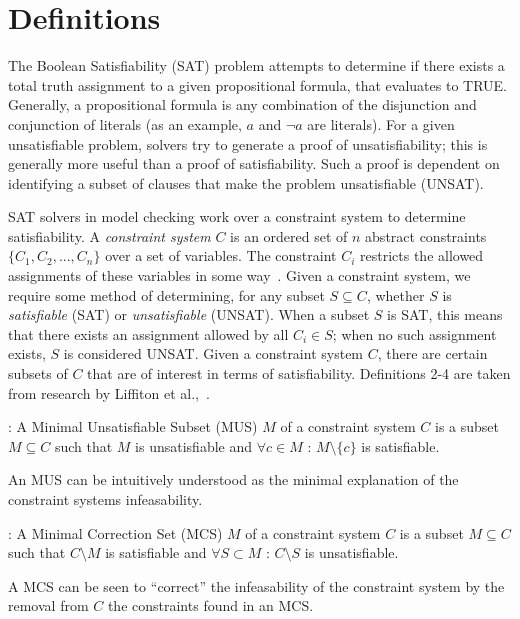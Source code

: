 \section{Definitions}
The Boolean Satisfiability (SAT) problem attempts to determine if there exists a total truth assignment to a given propositional formula, that evaluates to TRUE. Generally, a propositional formula is any combination of the disjunction and conjunction of literals (as an example, $a$ and $\neg a$ are literals). For a given unsatisfiable problem, solvers try to generate a proof of unsatisfiability; this is generally more useful than a proof of satisfiability. Such a proof is dependent on identifying a subset of clauses that make the problem unsatisfiable (UNSAT). 

SAT solvers in model checking work over a constraint system to determine satisfiability. A \textit{constraint system} $C$ is an ordered set of $n$ abstract constraints $\{C_1, C_2, ..., C_n\}$ over a set of variables. The constraint $C_i$ restricts the allowed assignments of these variables in some way~\cite{liffiton2016fast}. Given a constraint system, we require some method of determining, for any subset $S \subseteq C$, whether $S$ is \textit{satisfiable} (SAT) or \textit{unsatisfiable} (UNSAT). When a subset $S$ is SAT, this means that there exists an assignment allowed by all $C_i \in S$; when no such assignment exists, $S$ is considered UNSAT. Given a constraint system $C$, there are certain subsets of $C$ that are of interest in terms of satisfiability. Definitions 2-4 are taken from research by Liffiton et al.,~\cite{liffiton2016fast}. 

\begin{definition} : A Minimal Unsatisfiable Subset (MUS) $M$ of a constraint system $C$ is a subset $M \subseteq C$ such that $M$ is unsatisfiable and $\forall c \in M$ : $M \setminus \{c\}$ is satisfiable. 
\end{definition}
\noindent
An MUS can be intuitively understood as the minimal explanation of the constraint systems infeasability. 
\begin{definition} : A Minimal Correction Set (MCS) $M$ of a constraint system $C$ is a subset $M\subseteq C$ such that $C \setminus M$ is satisfiable and $\forall S \subset M$ : $C \setminus S$ is unsatisfiable. 
\end{definition}
\noindent
A MCS can be seen to ``correct'' the infeasability of the constraint system by the removal from $C$ the constraints found in an MCS.

